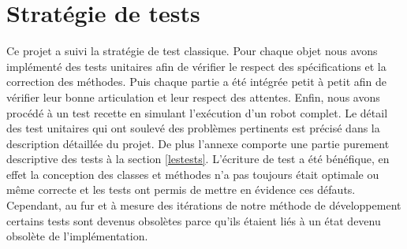 \section{Stratégie de tests}

Ce projet a suivi la stratégie de test classique. Pour chaque objet nous avons implémenté des tests unitaires afin de vérifier le respect des spécifications et la correction des méthodes. Puis chaque partie a été intégrée petit à petit afin de vérifier leur bonne articulation et leur respect des attentes. Enfin, nous avons procédé à un test recette en simulant l'exécution d'un robot complet.
Le détail des test unitaires qui ont soulevé des problèmes pertinents est précisé dans la description détaillée du projet.
De plus l'annexe comporte une partie purement descriptive des tests à la section \ref{lestests}. 
L'écriture de test a été bénéfique, en effet la conception des classes et méthodes n'a pas toujours était optimale ou même correcte et les tests ont permis de mettre en évidence ces défauts.
Cependant, au fur et à mesure des itérations de notre méthode de développement certains tests sont devenus obsolètes parce qu'ils étaient liés à un état devenu obsolète de l'implémentation. 


